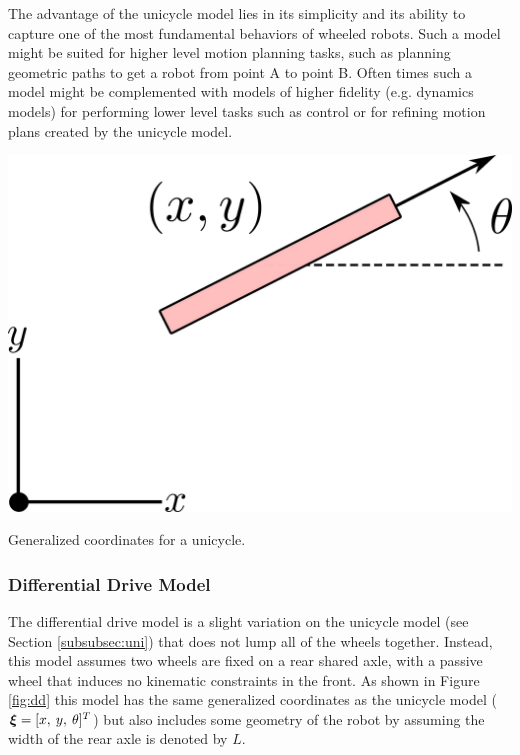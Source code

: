 The advantage of the unicycle model lies in its simplicity and its ability to capture one of the most fundamental behaviors of wheeled robots. Such a model might be suited for higher level motion planning tasks, such as planning geometric paths to get a robot from point A to point B. Often times such a model might be complemented with models of higher fidelity (e.g. dynamics models) for performing lower level tasks such as control or for refining motion plans created by the unicycle model.
\begin{marginfigure}
    \centering 
    \includegraphics[width=0.8\linewidth]{tex/figs/ch01_figs/unicycle.png}
    \caption{Generalized coordinates for a unicycle.} 
    \label{fig:uni} 
\end{marginfigure} 


\subsubsection{Differential Drive Model}
The differential drive model is a slight variation on the unicycle model (see Section \ref{subsubsec:uni}) that does not lump all of the wheels together. Instead, this model assumes two wheels are fixed on a rear shared axle, with a passive wheel that induces no kinematic constraints in the front.
As shown in Figure \ref{fig:dd} this model has the same generalized coordinates as the unicycle model ($\bm{\xi} = [x,\:y,\:\theta]^T$) but also includes some geometry of the robot by assuming the width of the rear axle is denoted by $L$.

